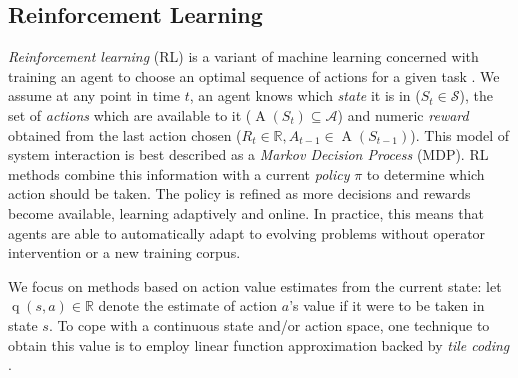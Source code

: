 \documentclass[10pt, times, conference, letterpaper]{IEEEtran}
\begin{document}
\subsection{Reinforcement Learning}\label{sec:reinforcement-learning}
\emph{Reinforcement learning} (RL) is a variant of machine learning concerned with training an agent to choose an optimal sequence of actions for a given task \cite{RL2E}.
We assume at any point in time $t$, an agent knows which \emph{state} it is in ($S_t \in \mathcal{S}$), the set of \emph{actions} which are available to it ($\operatorname{A}(S_t) \subseteq \mathcal{A}$) and numeric \emph{reward} obtained from the last action chosen ($R_t \in \mathbb{R}, A_{t-1} \in \operatorname{A}(S_{t-1})$).
This model of system interaction is best described as a \emph{Markov Decision Process} (MDP).
RL methods combine this information with a current \emph{policy} $\pi$ to determine which action should be taken.
The policy is refined as more decisions and rewards become available, learning adaptively and online.
In practice, this means that agents are able to automatically adapt to evolving problems without operator intervention or a new training corpus.

We focus on methods based on action value estimates from the current state: let $\operatorname{q}(s, a) \in \mathbb{R}$ denote the estimate of action $a$'s value if it were to be taken in state $s$.
To cope with a continuous state and/or action space, one technique to obtain this value is to employ linear function approximation backed by \emph{tile coding} \cite[pp.\ \numrange{217}{221}]{RL2E}.
\end{document}

